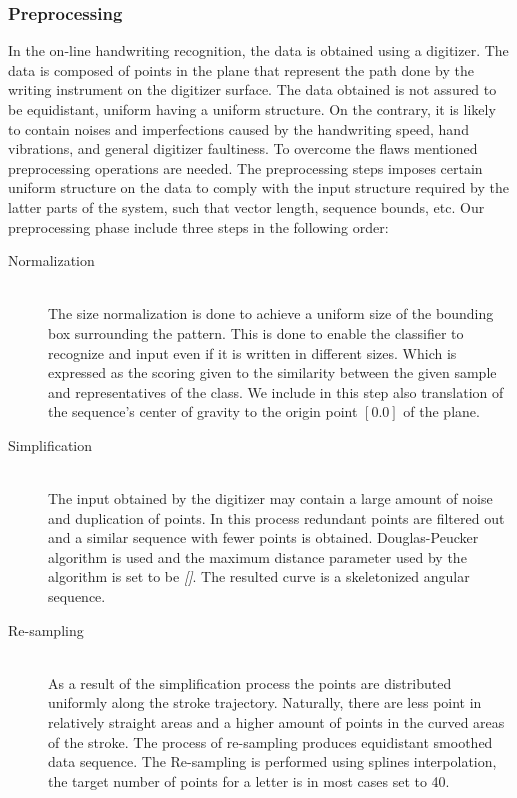 \documentclass[journal,compsoc]{IEEEtran}
\begin{document}
\subsubsection{Preprocessing}
In the on-line handwriting recognition, the data is obtained using a  digitizer. The data is composed of points in the plane that represent the path done by the writing instrument on the digitizer surface. The data obtained is not assured to be equidistant, uniform having a uniform structure. On the contrary, it is likely to contain noises and imperfections caused by the handwriting speed, hand vibrations, and general digitizer faultiness.   
To overcome the flaws mentioned preprocessing operations are needed. The preprocessing steps imposes certain uniform structure on the data to comply with the input structure required by the latter parts of the system, such that vector length, sequence bounds, etc.
Our preprocessing phase include three steps in the following order:
\begin{description}
  \item[Normalization] \hfill \\
  The size normalization is done to achieve a uniform size of the bounding box surrounding the pattern. This is done to enable the classifier to recognize and input even if it is written in different sizes. Which is expressed as the scoring given to the similarity between the given sample and representatives of the class. We include in this step also translation of the sequence's center of gravity to the origin point $[0.0]$ of the plane.
  \item[Simplification] \hfill \\
  The input obtained by the digitizer may contain a large amount of noise and duplication of points. In this process redundant points are filtered out and a similar sequence with fewer points is obtained. Douglas-Peucker algorithm is used and the maximum distance parameter used by the algorithm is set to be \emph{[]}. The resulted curve is a skeletonized angular sequence. 
  \item[Re-sampling] \hfill \\
  As a result of the simplification process the points are distributed uniformly along the stroke trajectory. Naturally, there are less point in relatively straight areas and a higher amount of points in the curved areas of the stroke. The process of re-sampling produces equidistant smoothed data sequence. The Re-sampling is performed using splines interpolation, the target number of points for a letter is in most cases set to 40. 
\end{description}
\end{document}
